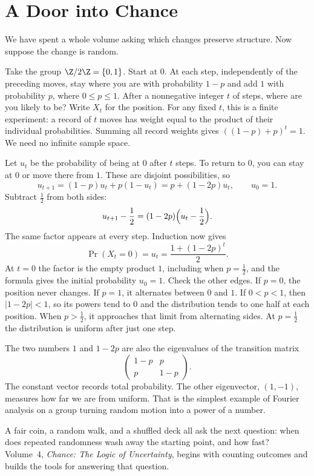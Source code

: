 \chapter*{A Door into Chance}

We have spent a whole volume asking which changes preserve structure. Now suppose the change is random.

Take the group $\Z/2\Z=\{0,1\}$. Start at $0$. At each step, independently
of the preceding moves, stay where you are with probability $1-p$ and add
$1$ with probability $p$, where $0\le p\le1$. After a nonnegative integer
$t$ of steps, where are you likely to be? Write $X_t$ for the position.
For any fixed $t$, this is a finite experiment: a record of $t$ moves has
weight equal to the product of their individual probabilities. Summing all
record weights gives $((1-p)+p)^t=1$. We need no infinite sample space.

Let $u_t$ be the probability of being at $0$ after $t$ steps. To return to $0$, you can stay at $0$ or move there from $1$. These are disjoint possibilities, so
\[
u_{t+1}=(1-p)u_t+p(1-u_t)
       =p+(1-2p)u_t,\qquad u_0=1.
\]
Subtract $\frac12$ from both sides:
\[
u_{t+1}-\frac12=(1-2p)\Bigl(u_t-\frac12\Bigr).
\]
The same factor appears at every step. Induction now gives
\[
\boxed{\displaystyle
\Pr(X_t=0)=u_t=\frac{1+(1-2p)^t}{2}.}
\]
At $t=0$ the factor is the empty product $1$, including when $p=\frac12$,
and the formula gives the initial probability $u_0=1$.
Check the other edges. If $p=0$, the position never changes. If $p=1$, it
alternates between $0$ and $1$. If $0<p<1$, then $|1-2p|<1$, so its
powers tend to $0$ and the distribution tends to one half at each position.
When $p>\frac12$, it approaches that limit from alternating sides.
At $p=\frac12$ the distribution is uniform after just one step.

The two numbers $1$ and $1-2p$ are also the eigenvalues of the transition matrix
\[
\begin{pmatrix}1-p&p\\p&1-p\end{pmatrix}.
\]
The constant vector records total probability. The other eigenvector, $(1,-1)$, measures how far we are from uniform. That is the simplest example of Fourier analysis on a group turning random motion into a power of a number.

A fair coin, a random walk, and a shuffled deck all ask the next question: when does repeated randomness wash away the starting point, and how fast? Volume~4, \emph{Chance: The Logic of Uncertainty}, begins with counting outcomes and builds the tools for answering that question.
